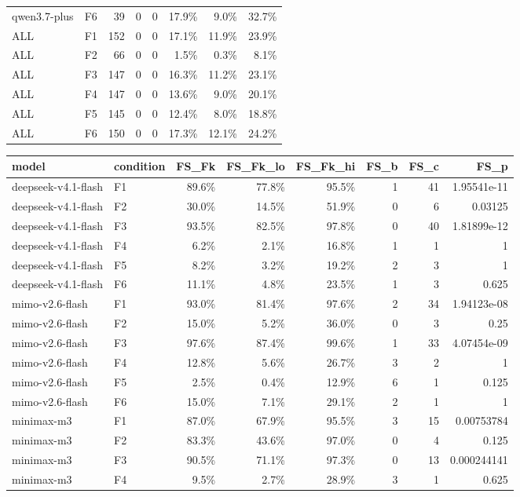 \begin{tabular}{llrrrrrr}
qwen3.7-plus & F6 & 39 & 0 & 0 & 17.9\% & 9.0\% & 32.7\% \\
ALL & F1 & 152 & 0 & 0 & 17.1\% & 11.9\% & 23.9\% \\
ALL & F2 & 66 & 0 & 0 & 1.5\% & 0.3\% & 8.1\% \\
ALL & F3 & 147 & 0 & 0 & 16.3\% & 11.2\% & 23.1\% \\
ALL & F4 & 147 & 0 & 0 & 13.6\% & 9.0\% & 20.1\% \\
ALL & F5 & 145 & 0 & 0 & 12.4\% & 8.0\% & 18.8\% \\
ALL & F6 & 150 & 0 & 0 & 17.3\% & 12.1\% & 24.2\% \\
\bottomrule
\end{tabular}

\begin{tabular}{llrrrrrr}
\toprule
model & condition & FS\_Fk & FS\_Fk\_lo & FS\_Fk\_hi & FS\_b & FS\_c & FS\_p \\
\midrule
deepseek-v4.1-flash & F1 & 89.6\% & 77.8\% & 95.5\% & 1 & 41 & 1.95541e-11 \\
deepseek-v4.1-flash & F2 & 30.0\% & 14.5\% & 51.9\% & 0 & 6 & 0.03125 \\
deepseek-v4.1-flash & F3 & 93.5\% & 82.5\% & 97.8\% & 0 & 40 & 1.81899e-12 \\
deepseek-v4.1-flash & F4 & 6.2\% & 2.1\% & 16.8\% & 1 & 1 & 1 \\
deepseek-v4.1-flash & F5 & 8.2\% & 3.2\% & 19.2\% & 2 & 3 & 1 \\
deepseek-v4.1-flash & F6 & 11.1\% & 4.8\% & 23.5\% & 1 & 3 & 0.625 \\
mimo-v2.6-flash & F1 & 93.0\% & 81.4\% & 97.6\% & 2 & 34 & 1.94123e-08 \\
mimo-v2.6-flash & F2 & 15.0\% & 5.2\% & 36.0\% & 0 & 3 & 0.25 \\
mimo-v2.6-flash & F3 & 97.6\% & 87.4\% & 99.6\% & 1 & 33 & 4.07454e-09 \\
mimo-v2.6-flash & F4 & 12.8\% & 5.6\% & 26.7\% & 3 & 2 & 1 \\
mimo-v2.6-flash & F5 & 2.5\% & 0.4\% & 12.9\% & 6 & 1 & 0.125 \\
mimo-v2.6-flash & F6 & 15.0\% & 7.1\% & 29.1\% & 2 & 1 & 1 \\
minimax-m3 & F1 & 87.0\% & 67.9\% & 95.5\% & 3 & 15 & 0.00753784 \\
minimax-m3 & F2 & 83.3\% & 43.6\% & 97.0\% & 0 & 4 & 0.125 \\
minimax-m3 & F3 & 90.5\% & 71.1\% & 97.3\% & 0 & 13 & 0.000244141 \\
minimax-m3 & F4 & 9.5\% & 2.7\% & 28.9\% & 3 & 1 & 0.625 \\

\end{tabular}
